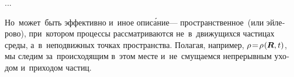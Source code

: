 \begin{otherlanguage}{russian}
...


Но~может~быть эффективно и~иное опис\'{а}ние\:--- пространственное~(или эйлерово), при~котором процессы рассматриваются не~в~движущихся частицах среды, а~в~неподвижных точках пространства. Полагая, например, ${\rho \!=\! \rho \hspace{.16ex} (\hspace{-0.1ex}\bm{R}, t)}$, мы следим за~происходящим в~этом месте и~не~смущаемся непрерывным уходом и~приходом частиц.

\end{otherlanguage}



\label{para:differentiation}

